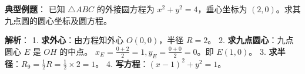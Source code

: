 \begin{examplebox}
\textbf{典型例题}：
已知 $\triangle ABC$ 的外接圆方程为 $x^2 + y^2 = 4$，垂心坐标为 $(2, 0)$。求其九点圆的圆心坐标及圆方程。

\textbf{解析}：
1. \textbf{求外心}：由方程知外心 $O(0, 0)$，半径 $R=2$。
2. \textbf{求九点圆心}：九点圆心 $E$ 是 $OH$ 的中点。
   $x_E = \frac{0+2}{2} = 1, y_E = \frac{0+0}{2} = 0$。即 $E(1, 0)$。
3. \textbf{求半径}：$R_9 = \frac{1}{2}R = \frac{1}{2} \times 2 = 1$。
4. \textbf{写方程}：$(x-1)^2 + y^2 = 1$。
\end{examplebox}